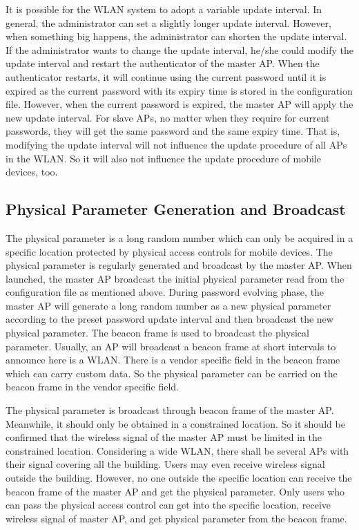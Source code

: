 It is possible for the WLAN system to adopt a variable update interval. In general, the administrator can set a slightly longer update interval. However, when something big happens, the administrator can shorten the update interval. If the administrator wants to change the update interval, he/she could modify the update interval and restart the authenticator of the master AP. When the authenticator restarts, it will continue using the current password until it is expired as the current password with its expiry time is stored in the configuration file. However, when the current password is expired, the master AP will apply the new update interval. For slave APs, no matter when they require for current passwords, they will get the same password and the same expiry time. That is, modifying the update interval will not influence the update procedure of all APs in the WLAN. So it will also not influence the update procedure of mobile devices, too. 

\subsection{Physical Parameter Generation and Broadcast}
The physical parameter is a long random number which can only be acquired in a specific location protected by physical access controls for mobile devices. The physical parameter is regularly generated and broadcast by the master AP. When launched, the master AP broadcast the initial physical parameter read from the configuration file as mentioned above. During password evolving phase, the master AP will generate a long random number as a new physical parameter according to the preset password update interval and then broadcast the new physical parameter. The beacon frame is used to broadcast the physical parameter. Usually, an AP will broadcast a beacon frame at short intervals to announce here is a WLAN. There is a vendor specific field in the beacon frame which can carry custom data. So the physical parameter can be carried on the beacon frame in the vendor specific field. 

The physical parameter is broadcast through beacon frame of the master AP. Meanwhile, it should only be obtained in a constrained location. So it should be confirmed that the wireless signal of the master AP must be limited in the constrained location. Considering a wide WLAN, there shall be several APs with their signal covering all the building. Users may even receive wireless signal outside the building. However, no one outside the specific location can receive the beacon frame of the master AP and get the physical parameter. Only users who can pass the physical access control can get into the specific location, receive wireless signal of master AP, and get physical parameter from the beacon frame. 

